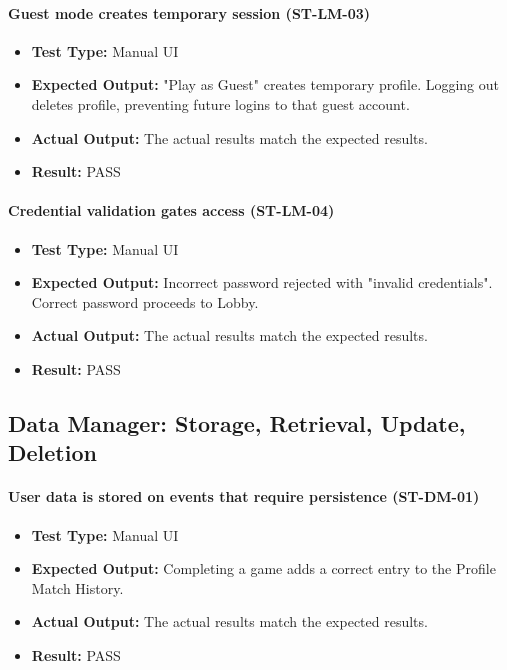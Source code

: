 \documentclass[12pt, titlepage]{article}
\begin{document}
\paragraph{Guest mode creates temporary session (ST-LM-03)}
\begin{itemize}
  \item \textbf{Test Type:} Manual UI
  \item \textbf{Expected Output:} "Play as Guest" creates temporary profile. Logging out deletes profile, preventing future logins to that guest account.
  \item \textbf{Actual Output:} The actual results match the expected results.
  \item \textbf{Result:} PASS
\end{itemize}

\paragraph{Credential validation gates access (ST-LM-04)}
\begin{itemize}
  \item \textbf{Test Type:} Manual UI
  \item \textbf{Expected Output:} Incorrect password rejected with "invalid credentials". Correct password proceeds to Lobby.
  \item \textbf{Actual Output:} The actual results match the expected results.
  \item \textbf{Result:} PASS
\end{itemize}


\subsection{Data Manager: Storage, Retrieval, Update, Deletion}

\paragraph{User data is stored on events that require persistence (ST-DM-01)}
\begin{itemize}
  \item \textbf{Test Type:} Manual UI
  \item \textbf{Expected Output:} Completing a game adds a correct entry to the Profile Match History.
  \item \textbf{Actual Output:} The actual results match the expected results.
  \item \textbf{Result:} PASS
\end{itemize}
\end{document}
